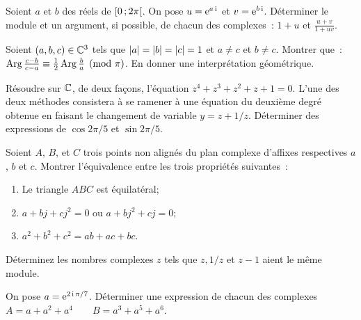 \begin{exercice}
  Soient \(a\) et \(b\) des réels de \(\left[ 0 \, ; {} 2\pi \right[\). On pose \(u =
  \operatorname{e}^{a\operatorname{i}}\) et \(v = \operatorname{e}^{b\operatorname{i}}\). Déterminer le module et un argument, si
  possible, de chacun des complexes~: \(1 + u\) et \(\frac{u + v}{1 + uv}\).
\end{exercice}

\begin{exercice}
  Soient \((a, b, c) \in{}\mathbb{C}^3\) tels que \(\left\lvert a\right\rvert = \left\lvert b\right\rvert = \left\lvert c\right\rvert = 1\)
  et \(a \neq c\) et \(b \neq c\). Montrer que~:\(\operatorname{Arg} \frac{c-b}{c-a} \equiv
  \frac{1}{2} \operatorname{Arg} \frac{b}{a} \pmod \pi\). En donner une interprétation
  géométrique.
\end{exercice}

\begin{exercice}
  Résoudre sur \(\mathbb{C}\), de deux façons, l'équation \(z^4 + z^3 + z^2 + z + 1 =
  0\). L'une des deux méthodes consistera à se ramener à une équation du
  deuxième degré obtenue en faisant le changement de variable \(y = z + 1/z\).
  Déterminer des expressions de \(\cos 2\pi/5\) et \(\sin 2\pi/5\).
\end{exercice}

\begin{exercice}
  Soient \(A\), \(B\), et \(C\) trois points non alignés du plan complexe
  d'affixes respectives \(a\), \(b\) et \(c\). Montrer l'équivalence entre les
  trois propriétés suivantes~:
  \begin{enumerate}
    \item Le triangle \(ABC\) est équilatéral;
    \item \(a + bj + cj^2 = 0\) ou \(a + bj^2 + cj = 0\);
    \item \(a^2 + b^2 + c^2 = ab + ac + bc\).
  \end{enumerate}
\end{exercice}

\begin{exercice}
  Déterminez les nombres complexes \(z\) tels que \(z, 1/z\) et \(z-1\) aient
  le même module.
\end{exercice}

\begin{exercice}
  On pose \(a = \operatorname{e}^{2\operatorname{i}\pi/7}\). Déterminer une expression de chacun des
  complexes \(A = a + a^2 + a^4 \qquad B = a^3 + a^5 + a^6\).
\end{exercice}

